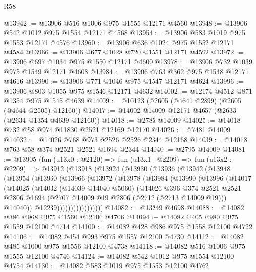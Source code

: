 \begin{lexlean}{R58}
\begin{coremodule}
@13942 := @13906 @516 @1006 @975 @1555 @12171 @4560
@13948 := @13906 @542 @1012 @975 @1554 @12171 @4568
@13954 := @13906 @583 @1019 @975 @1553 @12171 @4576
@13960 := @13906 @636 @1024 @975 @1552 @12171 @4584
@13966 := @13906 @677 @1028 @720 @1551 @12171 @4592
@13972 := @13906 @697 @1034 @975 @1550 @12171 @4600
@13978 := @13906 @732 @1039 @975 @1549 @12171 @4608
@13984 := @13906 @763 @362 @975 @1548 @12171 @4616
@13990 := @13906 @771 @1046 @975 @1547 @12171 @4624
@13996 := @13906 @803 @1055 @975 @1546 @12171 @4632
@14002 := @12174 @4512 @871 @1354 @975 @1545 @4639
@14009 := @10123 (@2605 (@4641 @2899) (@2605 (@4644 @2505) @12160))
@14017 := @14002 @14009 @12171 @4657 (@2633 (@2634 @1354 @4639 @12160))
@14018 := @2785 @14009
@14025 := @14018 @732 @58 @974 @11830 @2521 @12169 @12170
@14026 := @7481 @14009
@14032 := @14026 @768 @973 @2526 @2526 @2344 @12168
@14039 := @14018 @763 @58 @374 @2521 @2521 @1694 @2344
@14040 := @2795 @14009
@14081 := @13905
    (fun (u13x0 : @2120) =>
    fun (u13x1 : @2209) =>
    fun (u13x2 : @2209) =>
    @13912
      (@13918
        (@13924
          (@13930
            (@13936
              (@13942
                (@13948
                  (@13954
                    (@13960
                      (@13966
                        (@13972
                          (@13978
                            (@13984
                              (@13990
                                (@13996
                                  (@14017
                                    (@14025
                                      (@14032
                                        (@14039 @14040 @5060)
                                        (@14026
                                          @396
                                          @374
                                          @2521
                                          @2521
                                          @2806
                                          @1694
                                          (@2707 @14009 @19 @2806 (@2712 (@2713 @14009 @19)))
                                          @14040))
                                      @12239)))))))))))))))))
@14082 := @13249 @4698
@14088 := @14082 @386 @968 @975 @1560 @12100 @4706
@14094 := @14082 @405 @980 @975 @1559 @12100 @4714
@14100 := @14082 @428 @986 @975 @1558 @12100 @4722
@14106 := @14082 @454 @993 @975 @1557 @12100 @4730
@14112 := @14082 @485 @1000 @975 @1556 @12100 @4738
@14118 := @14082 @516 @1006 @975 @1555 @12100 @4746
@14124 := @14082 @542 @1012 @975 @1554 @12100 @4754
@14130 := @14082 @583 @1019 @975 @1553 @12100 @4762

\end{coremodule}
\end{lexlean}
